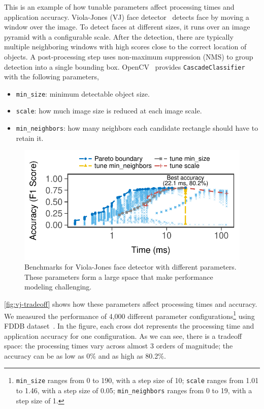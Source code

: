  This is an example of how tunable parameters
affect processing times and application accuracy. Viola-Jones (VJ) face
detector~\cite{viola2001rapid} detects face by moving a window over the image.
To detect faces at different sizes, it runs over an image pyramid with a
configurable scale. After the detection, there are typically multiple
neighboring windows with high scores close to the correct location of objects.
A post-processing step uses non-maximum suppression (NMS) to group detection
into a single bounding box. OpenCV~\cite{opencvlibrary} provides
\texttt{CascadeClassifier} with the following parameters,

\begin{itemize}[noitemsep, topsep=0pt]
\item \texttt{min\_size}: minimum detectable object size.
\item \texttt{scale}: how much image size is reduced at each image scale.
\item \texttt{min\_neighbors}: how many neighbors each candidate rectangle should
  have to retain it.
\end{itemize}

\begin{figure}[t]
  \centering
  \includegraphics[width=.8\columnwidth]{figures/exhaustive-face.pdf}
  \caption{Benchmarks for Viola-Jones face detector with different
    parameters. These parameters form a large space that make performance
    modeling challenging.}
  \label{fig:vj-tradeoff}
\end{figure}

\autoref{fig:vj-tradeoff} shows how these parameters affect processing times and
accuracy. We measured the performance of 4,000 different parameter
configurations\footnote{\texttt{min\_size} ranges from 0 to 190, with a step
  size of 10; \texttt{scale} ranges from 1.01 to 1.46, with a step size of 0.05;
  \texttt{min\_neighbors} ranges from 0 to 19, with a step size of 1.} using
FDDB dataset~\cite{jain2010fddb}. In the figure, each cross dot represents the
processing time and application accuracy for one configuration. As we can see,
there is a tradeoff space: the processing times vary across almost 3 orders of
magnitude; the accuracy can be as low as 0\% and as high as 80.2\%.

